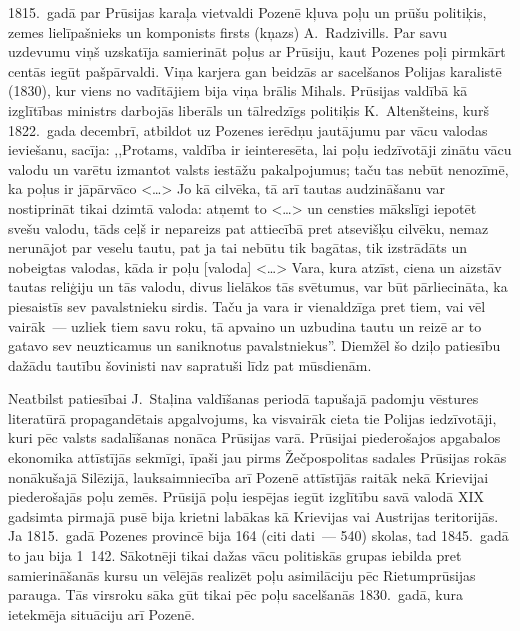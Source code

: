 \documentclass[twoside,a5paper,12pt,fleqn,openany]{extbook}
\newcommand{\citespace}{<\dots{}>}
\begin{document}
1815.~gadā par Prūsijas karaļa vietvaldi Pozenē kļuva poļu un prūšu politiķis, zemes lielīpašnieks un komponists firsts (kņazs) A.~Radzivills. Par savu uzdevumu viņš uzskatīja samierināt poļus ar Prūsiju, kaut Pozenes poļi pirmkārt centās iegūt pašpārvaldi. Viņa karjera gan beidzās ar sacelšanos Polijas karalistē (1830), kur viens no vadītājiem bija viņa brālis Mihals. Prūsijas valdībā kā izglītības ministrs darbojās liberāls un tālredzīgs politiķis K.~Altenšteins, kurš 1822.~gada decembrī, atbildot uz Pozenes ierēdņu jautājumu par vācu valodas ieviešanu, sacīja: ,,Protams, valdība ir ieinteresēta, lai poļu iedzīvotāji zinātu vācu valodu un varētu izmantot valsts iestāžu pakalpojumus; taču tas nebūt nenozīmē, ka poļus ir jāpārvāco \citespace{} Jo kā cilvēka, tā arī tautas audzināšanu var nostiprināt tikai dzimtā valoda: atņemt to \citespace{} un censties mākslīgi iepotēt svešu valodu, tāds ceļš ir nepareizs pat attiecībā pret atsevišķu cilvēku, nemaz nerunājot par veselu tautu, pat ja tai nebūtu tik bagātas, tik izstrādāts un nobeigtas valodas, kāda ir poļu [valoda] \citespace{} Vara, kura atzīst, ciena un aizstāv tautas reliģiju un tās valodu, divus lielākos tās svētumus, var būt pārliecināta, ka piesaistīs sev pavalstnieku sirdis. Taču ja vara ir vienaldzīga pret tiem, vai vēl vairāk~--- uzliek tiem savu roku, tā apvaino un uzbudina tautu un reizē ar to gatavo sev neuzticamus un saniknotus pavalstniekus''. Diemžēl šo dziļo patiesību dažādu tautību šovinisti nav sapratuši līdz pat mūsdienām.

Neatbilst patiesībai J.~Staļina valdīšanas periodā tapušajā padomju vēstures literatūrā propagandētais apgalvojums, ka visvairāk cieta tie Polijas iedzīvotāji, kuri pēc valsts sadalīšanas nonāca Prūsijas varā. Prūsijai piederošajos apgabalos ekonomika attīstījās sekmīgi, īpaši jau pirms Žečpospolitas sadales Prūsijas rokās nonākušajā Silēzijā, lauksaimniecība arī Pozenē attīstījās raitāk nekā Krievijai piederošajās poļu zemēs. Prūsijā poļu iespējas iegūt izglītību savā valodā XIX gadsimta pirmajā pusē bija krietni labākas kā Krievijas vai Austrijas teritorijās. Ja 1815.~gadā Pozenes provincē bija 164 (citi dati~--- 540) skolas, tad 1845.~gadā to jau bija 1~142. Sākotnēji tikai dažas vācu politiskās grupas iebilda pret samierināšanās kursu un vēlējās realizēt poļu asimilāciju pēc Rietumprūsijas parauga. Tās virsroku sāka gūt tikai pēc poļu sacelšanās 1830.~gadā, kura ietekmēja situāciju arī Pozenē.
\end{document}
